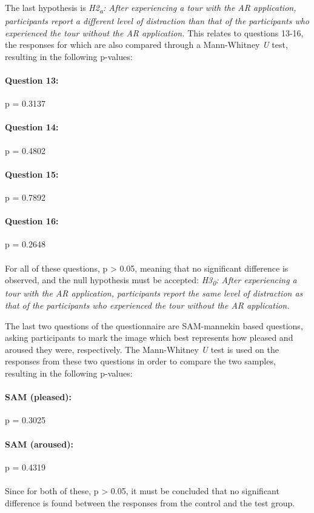 The last hypothesis is \textit{H2\textsubscript{a}: After experiencing a tour with the AR application, participants report a different level of distraction than that of the participants who experienced the tour without the AR application.} This relates to questions 13-16, the responses for which are also compared through a Mann-Whitney \textit{U} test, resulting in the following p-values:

\paragraph{Question 13:} p = 0.3137
\paragraph{Question 14:} p = 0.4802
\paragraph{Question 15:} p = 0.7892
\paragraph{Question 16:} p = 0.2648\\
\\
For all of these questions, p > 0.05, meaning that no significant difference is observed, and the null hypothesis must be accepted: \textit{H3\textsubscript{0}: After experiencing a tour with the AR application, participants report the same level of distraction as that of the participants who experienced the tour without the AR application.}

The last two questions of the questionnaire are SAM-mannekin based questions, asking participants to mark the image which best represents how pleased and aroused they were, respectively. The Mann-Whitney \textit{U} test is used on the responses from these two questions in order to compare the two samples, resulting in the following p-values:

\paragraph{SAM (pleased):} p = 0.3025
\paragraph{SAM (aroused):} p = 0.4319\\
\\
Since for both of these, p > 0.05, it must be concluded that no significant difference is found between the responses from the control and the test group.

